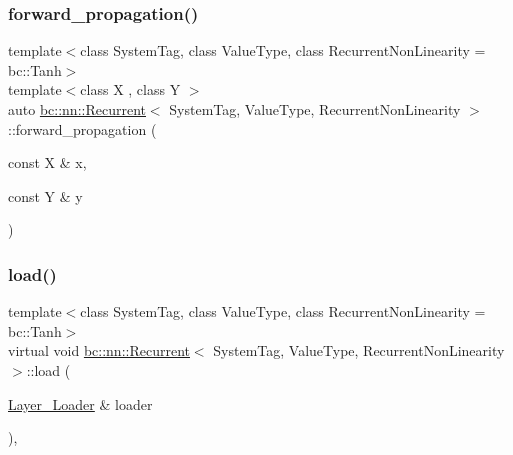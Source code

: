 \mbox{\label{structbc_1_1nn_1_1Recurrent_a6e9e827f94aa6b84614d5b84774dbb97}} 
\subsubsection{\texorpdfstring{forward\+\_\+propagation()}{forward\_propagation()}\hspace{0.1cm}{\footnotesize\ttfamily [2/2]}}
{\footnotesize\ttfamily template$<$class System\+Tag, class Value\+Type, class Recurrent\+Non\+Linearity = bc\+::\+Tanh$>$ \\
template$<$class X , class Y $>$ \\
auto \hyperlink{structbc_1_1nn_1_1Recurrent}{bc\+::nn\+::\+Recurrent}$<$ System\+Tag, Value\+Type, Recurrent\+Non\+Linearity $>$\+::forward\+\_\+propagation (\begin{DoxyParamCaption}\item[{const X \&}]{x,  }\item[{const Y \&}]{y }\end{DoxyParamCaption})\hspace{0.3cm}{\ttfamily [inline]}}

\mbox{\label{structbc_1_1nn_1_1Recurrent_aa2b86788ec2841005afb5209b7eb7282}} 
\subsubsection{\texorpdfstring{load()}{load()}}
{\footnotesize\ttfamily template$<$class System\+Tag, class Value\+Type, class Recurrent\+Non\+Linearity = bc\+::\+Tanh$>$ \\
virtual void \hyperlink{structbc_1_1nn_1_1Recurrent}{bc\+::nn\+::\+Recurrent}$<$ System\+Tag, Value\+Type, Recurrent\+Non\+Linearity $>$\+::load (\begin{DoxyParamCaption}\item[{\hyperlink{structbc_1_1nn_1_1Layer__Loader}{Layer\+\_\+\+Loader} \&}]{loader }\end{DoxyParamCaption})\hspace{0.3cm}{\ttfamily [inline]}, {\ttfamily [virtual]}}



